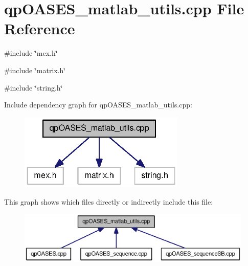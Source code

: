 \section{qpOASES\_\-matlab\_\-utils.cpp File Reference}
\label{qpOASES__matlab__utils_8cpp}
{\ttfamily \#include \char`\"{}mex.h\char`\"{}}\par
{\ttfamily \#include \char`\"{}matrix.h\char`\"{}}\par
{\ttfamily \#include \char`\"{}string.h\char`\"{}}\par
Include dependency graph for qpOASES\_\-matlab\_\-utils.cpp:
\nopagebreak
\begin{figure}[H]
\begin{center}
\leavevmode
\includegraphics[width=224pt]{qpOASES__matlab__utils_8cpp__incl}
\end{center}
\end{figure}
This graph shows which files directly or indirectly include this file:
\nopagebreak
\begin{figure}[H]
\begin{center}
\leavevmode
\includegraphics[width=400pt]{qpOASES__matlab__utils_8cpp__dep__incl}
\end{center}
\end{figure}
